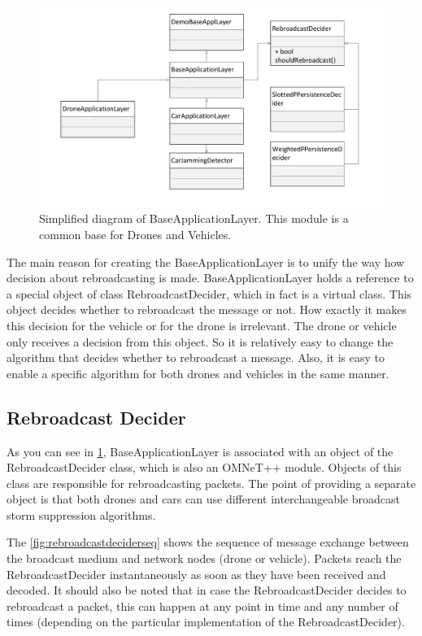 \documentclass[]{nsm-thesis}
\begin{document}
\begin{figure}
	\centering
	\includegraphics[width=1\textwidth]{figures/BaseApplicationLayer.pdf}
	\caption{Simplified diagram of BaseApplicationLayer. This module is a common base for Drones and Vehicles.}
	\label{fig:baseapplicationlayer}
\end{figure}

The main reason for creating the BaseApplicationLayer is to unify the way how decision about rebroadcasting is made. BaseApplicationLayer holds a reference to a special object of class RebroadcastDecider, which in fact is a virtual class. This object decides whether to rebroadcast the message or not. How exactly it makes this decision for the vehicle or for the drone is irrelevant. The drone or vehicle only receives a decision from this object. So it is relatively easy to change the algorithm that decides whether to rebroadcast a message. Also, it is easy to enable a specific algorithm for both drones and vehicles in the same manner.



\subsection {Rebroadcast Decider}

As you can see in \cref{fig:baseapplicationlayer}, BaseApplicationLayer is associated with an object of the RebroadcastDecider class, which is also an OMNeT++ module. Objects of this class are responsible for rebroadcasting packets. The point of providing a separate object is that both drones and cars can use different interchangeable broadcast storm suppression algorithms. 

The \cref{fig:rebroadcastdeciderseq} shows the sequence of message exchange between the broadcast medium and network nodes (drone or vehicle). Packets reach the RebroadcastDecider instantaneously as soon as they have been received and decoded. It should also be noted that in case the RebroadcastDecider decides to rebroadcast a packet, this can happen at any point in time and any number of times (depending on the particular implementation of the RebroadcastDecider).
\end{document}
